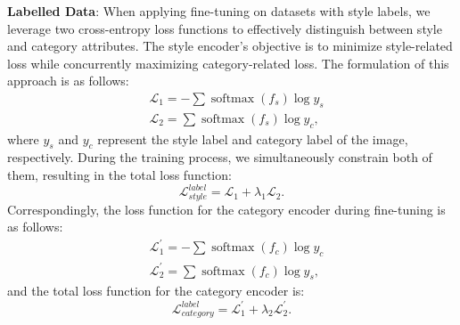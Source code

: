 \textbf{Labelled Data}: When applying fine-tuning on datasets with style labels, we leverage two cross-entropy loss functions to effectively distinguish between style and category attributes. The style encoder's objective is to minimize style-related loss while concurrently maximizing category-related loss. The formulation of this approach is as follows:
\begin{equation}
\begin{aligned}
&\mathcal{L}_{1}=-\sum \operatorname{softmax}(f_{s}) \log y_{s} \\
&\mathcal{L}_{2}=\sum \operatorname{softmax}(f_{s}) \log {y_{c}},
\end{aligned}
\end{equation}
where ${y_s}$ and $y_c$ represent the style label and category label of the image, respectively. During the training process, we simultaneously constrain both of them, resulting in the total loss function:
\begin{equation}
\mathcal{L}_{style}^{label}=\mathcal{L}_{1}+ {\lambda}_{1} \mathcal{L}_{2}.
\end{equation}
Correspondingly, the loss function for the category encoder during fine-tuning is as follows:
\begin{equation}
\begin{aligned}
&\mathcal{L}_{1}^{'}=-\sum \operatorname{softmax}(f_{c}) \log y_{c} \\
&\mathcal{L}_{2}^{'}=\sum \operatorname{softmax}(f_{c}) \log y_{s},
\end{aligned}
\end{equation}
and the total loss function for the category encoder is:
\begin{equation}
\mathcal{L}_{category}^{label}=\mathcal{L}_{1}^{'}+ {\lambda}_{2} \mathcal{L}_{2}^{'}.
\end{equation}


